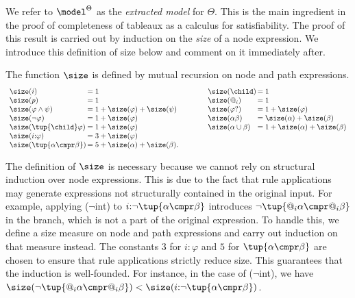 We refer to $\model^{\Theta}$ as the \emph{extracted model} for $\Theta$.
This is the main ingredient in the proof of completeness of tableaux as a calculus for satisfiability.
The proof of this result is carried out by induction on the \emph{size} of a node expression. 
We introduce this definition of size below and comment on it immediately after. 

\begin{defi}\label{def:size}
    The function $\size$ is defined by mutual recursion on node and path expressions.
    \[\begin{array}{l@{\,}l@{\qquad}@{\qquad}l@{\,}l}
        \size(i) & = 1 & %
        \size(\child ) & = 1 \\ %
        \size(p) & = 1 & %
        \size(@_i) & = 1 \\ %
        \size(\varphi \land \psi) & = 1 + \size(\varphi) + \size(\psi) &
        \size(\varphi?) & = 1 + \size(\varphi) \\
        \size(\lnot \varphi) & = 1 + \size(\varphi) &
        \size( \alpha \beta ) & = \size(\alpha) + \size(\beta) \\
        \size(\tup{\child} \varphi) & = 1 + \size(\varphi) &
        \size( \alpha \cup \beta ) & = 1 + \size(\alpha) + \size(\beta) \\
        \size(i{:}\varphi) & = 3 + \size(\varphi) \\
        \size(\tup{\alpha \cmpr \beta}) & = 5 + \size(\alpha) + \size(\beta).
    \end{array}\]   
\end{defi}

The definition of $\size$ is necessary because we cannot rely on structural induction over node expressions. This is due to the fact that rule applications may generate expressions not structurally contained in the original input. For example, applying ($\lnot$int) to $i{:}\lnot\tup{\alpha \cmpr \beta}$ introduces $\lnot\tup{@_i\alpha \cmpr @_i\beta}$ in the branch, which is not a part of the original expression.
To handle this, we define a size measure on node and path expressions and carry out induction on that measure instead. The constants $3$ for $i{:}\varphi$ and $5$ for $\tup{\alpha \cmpr \beta}$ are chosen to ensure that rule applications strictly reduce size. This guarantees that the induction is well-founded. For instance, in the case of ($\lnot$int), we have $\size(\lnot\tup{@_i\alpha \cmpr @_i\beta}) < \size(i{:}\lnot\tup{\alpha \cmpr \beta})$.

